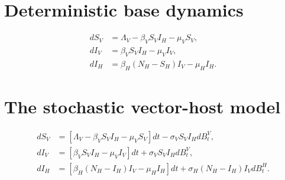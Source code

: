 \documentclass{amsart}
\theoremstyle{plain}
\theoremstyle{definition}
\begin{document}
    \section{Deterministic base dynamics}
       \begin{equation}
           \begin{aligned}
               d S_V &= \Lambda_V - \beta_V S_V I_H - \mu_V S_V, \\
               d I_V &= \beta_V S_V I_H - \mu_V I_V, \\
               d I_H &= \beta_H (N_H - S_H) I_V - \mu_H I_H.
           \end{aligned}
       \end{equation}
%
%
%
    \section{The stochastic vector-host model}
       \begin{equation} \label{eqn:sto_vector_host}
            \begin{aligned}
                d S_V &= 
                    \left [
                        \Lambda_V - \beta_V S_V I_H - \mu_V S_V 
                    \right ] dt
                    - \sigma_V S_V I_H dB_t^V,
                    \\
                d I_V &= 
                    \left [
                       \beta_V S_V I_H - \mu_V I_V 
                    \right ]
                    dt 
                    + \sigma_V S_V I_H dB_t^V,
                    \\
                d I_H &= 
                    \left [
                        \beta_H (N_H - I_H) I_V - \mu_H I_H
                    \right ] dt
                    + \sigma_H (N_H - I_H) I_V d B^H_t .
           \end{aligned}
       \end{equation}
\end{document}
